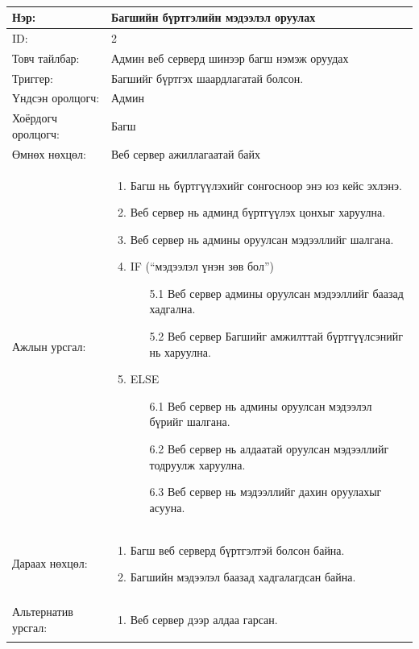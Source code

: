 \begin{center}
	\begin{table}[!htbp]
		\caption{}
		\begin{tabular}{|p{4cm}|p{11cm}|}
			\hline
			Нэр: & Багшийн бүртгэлийн мэдээлэл оруулах \\
			\hline
			ID: & 2 \\
			\hline
			Товч тайлбар: & Админ веб серверд шинээр багш нэмэж оруудах\\
			\hline
			Триггер: & Багшийг бүртгэх шаардлагатай болсон. \\
			\hline
			Үндсэн оролцогч: & Админ \\
			\hline
			Хоёрдогч оролцогч: & Багш  \\
			\hline
				Өмнөх нөхцөл: &  Веб сервер ажиллагаатай байх\\
			\hline
			Ажлын урсгал: & \begin{enumerate}
				\item Багш нь бүртгүүлэхийг сонгосноор энэ юз кейс эхлэнэ. 
				\item Веб сервер нь админд бүртгүүлэх цонхыг харуулна.  
				\item Веб сервер нь админы оруулсан мэдээллийг шалгана. 
				\item IF (“мэдээлэл үнэн зөв бол”)
				\begin{enumerate}
					\item[5.1] Веб сервер админы оруулсан мэдээллийг баазад хадгална.
					\item[5.2] Веб сервер Багшийг амжилттай бүртгүүлсэнийг нь харуулна. 
				\end{enumerate}
				\item ELSE
				\begin{enumerate}
					\item[6.1] Веб сервер нь админы оруулсан мэдээлэл бүрийг шалгана.  
					\item[6.2] Веб сервер нь алдаатай оруулсан мэдээллийг тодруулж харуулна. 
					\item[6.3] Веб сервер нь мэдээллийг дахин оруулахыг асууна. 
				\end{enumerate}
			\end{enumerate}
			\\					  \hline
			Дараах нөхцөл: &
			\begin{enumerate}
				\item Багш веб серверд бүртгэлтэй болсон байна. 
				\item Багшийн мэдээлэл баазад хадгалагдсан байна. 
			\end{enumerate}	   
			\\				   \hline
			Альтернатив урсгал: &  \begin{enumerate}
				\item Веб сервер дээр алдаа гарсан. 
			\end{enumerate}
			\\	\hline
		\end{tabular}
	\end{table}
\end{center}

